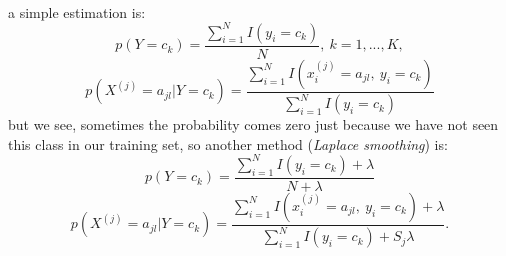 \documentclass{article}
\begin{document}
  \paragraph{} a simple estimation is:
  \begin{equation}
    p(Y = c_k) = \frac{\sum_{i = 1}^{N}I(y_i = c_k)}{N},\ k = 1,...,K,
  \end{equation}
  \begin{equation}
    p(X^{(j)} = a_{jl}|Y = c_k) = \frac{\sum_{i = 1}^N I(x_i^{(j)} = a_{jl},\ y_i = c_k)}{\sum_{i = 1}^{N}I(y_i = c_k)}
  \end{equation}
  but we see, sometimes the probability comes zero just because we have not seen this class in our training set, so another method (\textit{Laplace smoothing}) is:
  \begin{equation}
    p(Y = c_k) = \frac{\sum_{i = 1}^{N}I(y_i = c_k) + \lambda}{N + \lambda}
  \end{equation}
  \begin{equation}
    p(X^{(j)} = a_{jl}|Y = c_k) = \frac{\sum_{i = 1}^N I(x_i^{(j)} = a_{jl},\ y_i = c_k) + \lambda}{\sum_{i = 1}^{N}I(y_i = c_k) + S_j \lambda}.
  \end{equation}
\end{document}
